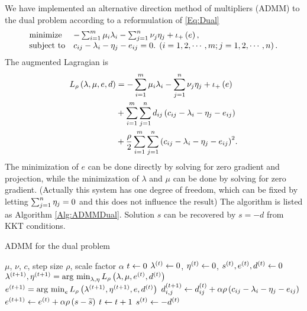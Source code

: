 \documentclass[english]{pkupaper}
\begin{document}
We have implemented an alternative direction method of multipliers (ADMM) to the dual problem according to a reformulation of \eqref{Eq:Dual}
\begin{equation}
\begin{array}{ll}
\mathrel{\text{{minimize}}} & -\sum_{ {i} = {1} }^{m}{ \mu_i \lambda_i } - \sum_{ {j} = {1} }^{n}{ \nu_j \eta_j } + \iota_+ \left( e \right), \\
\mathrel{\text{{subject to}}} & c_{ i j } - \lambda_i - \eta_j - e_{ i j } = 0. \mathbin{}\left(  i = 1, 2, \cdots, m; j = 1, 2, \cdots, n  \right).
\end{array}
\end{equation}
The augmented Lagragian is
\begin{equation}
\begin{aligned}
L_{\rho} \left(  \lambda, \mu, e, d  \right) &= -\sum_{ {i} = {1} }^{m}{ \mu_i \lambda_i } - \sum_{ {j} = {1} }^{n}{ \nu_j \eta_j } + \iota_+ \left( e \right) \\
&+ \sum_{ {i} = {1} }^{m}{\sum_{ {j} = {1} }^{n}{ d_{ i j } \left(  c_{ i j } - \lambda_i - \eta_j - e_{ i j }  \right) }} \\
&+ \frac{\rho}{2} \sum_{ {i} = {1} }^{m}{\sum_{ {j} = {1} }^{n}{\left(  c_{ i j } - \lambda_i - \eta_j - e_{ i j }  \right)^2}}.
\end{aligned}
\end{equation}
The minimization of $e$ can be done directly by solving for zero gradient and projection, while the minimization of $\lambda$ and $\mu$ can be done by solving for zero gradient. (Actually this system has one degree of freedom, which can be fixed by letting $ \sum_{ {j} = {1} }^{n}{\eta_j} = 0 $ and this does not influence the result)  The algorithm is listed as Algorithm \ref{Alg:ADMMDual}. Solution $s$ can be recovered by $ s = -d $ from KKT conditions.

\begin{algorithm}
\caption{ADMM for the dual problem}
\label{Alg:ADMMDual}
\begin{algorithmic}
\REQUIRE $\mu$, $\nu$, $c$, step size $\rho$, scale factor $\alpha$
\STATE $ t \leftarrow 0 $
\STATE $ \lambda^{\left( t \right)} \leftarrow 0 $, $ \eta^{\left( t \right)} \leftarrow 0 $, $ s^{\left( t \right)}, e^{\left( t \right)}, d^{\left( t \right)} \leftarrow 0 $
\STATE $ \lambda^{\left(  t + 1  \right)}, \eta^{\left(  t + 1  \right)} = \operatorname*{\arg\,\min}_{ \lambda, \eta } L_{\rho} \left(  \lambda, \mu, e^{\left( t \right)}, d^{\left( t \right)}  \right) $
\STATE $ e^{\left(  t + 1  \right)} = \operatorname*{\arg\,\min}_e L_{\rho} \left(  \lambda^{\left(  t + 1  \right)}, \eta^{\left(  t + 1  \right)}, e, d^{\left( t \right)}  \right) $
\STATE $ d^{\left(  t + 1  \right)}_{ i, j } \leftarrow d^{\left( t \right)}_{ i j } + \alpha \rho \left(  c_{ i j } - \lambda_i - \eta_j - e_{ i j }  \right) $
\STATE $ e^{\left(  t + 1  \right)} \leftarrow e^{\left( t \right)} + \alpha \rho \left(  s - \widetilde{s}  \right) $
\STATE $ t \leftarrow t + 1 $
\ENDWHILE
\STATE $ s^{\left( t \right)} \leftarrow -d^{\left( t \right)} $
\end{algorithmic}
\end{algorithm}
\end{document}
